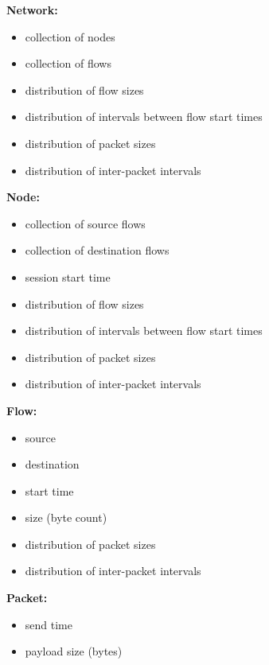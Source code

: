 \textbf{Network:}
\begin{itemize}
  \item collection of nodes
  \item collection of flows
  \item distribution of flow sizes
  \item distribution of intervals between flow start times
  \item distribution of packet sizes
  \item distribution of inter-packet intervals
\end{itemize}
\textbf{Node:}
\begin{itemize}
  \item collection of source flows
  \item collection of destination flows
  \item session start time
  \item distribution of flow sizes
  \item distribution of intervals between flow start times
  \item distribution of packet sizes
  \item distribution of inter-packet intervals
\end{itemize}
\textbf{Flow:}
\begin{itemize}
  \item source
  \item destination
  \item start time
  \item size (byte count)
  \item distribution of packet sizes
  \item distribution of inter-packet intervals
\end{itemize}
\textbf{Packet:}
\begin{itemize}
  \item send time
  \item payload size (bytes)
\end{itemize}
